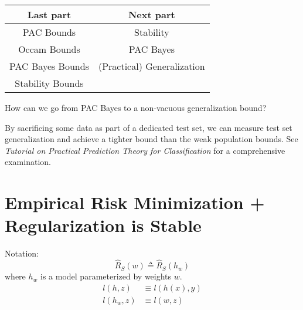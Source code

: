\documentclass{article}
\begin{document}
\begin{table}[h!]
\centering
\begin{tabular}{|c  | c|} 
 \hline
 \rowcolor{\shadethmcolor}
 \textbf{Last part} & \textbf{Next part} \\ [0.5ex] 
 \hline
 PAC Bounds &  Stability \\
 Occam Bounds & PAC Bayes \\
 PAC Bayes Bounds & (Practical) Generalization \\
 Stability Bounds &  \\
\hline
\end{tabular}
\end{table}

How can we go from PAC Bayes to a non-vacuous generalization bound?

\vspace{0.3cm}
By sacrificing some data as part of a dedicated test set, we can measure test set generalization and achieve a tighter bound than the weak population bounds.  See \textit{Tutorial on Practical Prediction Theory for Classification} \cite{Langford:2005:TPP:1046920.1058111} for a comprehensive examination.

\section*{Empirical Risk Minimization + Regularization is Stable}
Notation: 
$$\hat{R}_S(w) \triangleq \hat{R}_S(h_w)$$ where $h_w$ is a model parameterized by weights $w$.
\begin{align*}
    l(h,z)&\equiv l(h(x), y) \\
    l(h_w, z) &\equiv l(w,z)
\end{align*}
\end{document}
